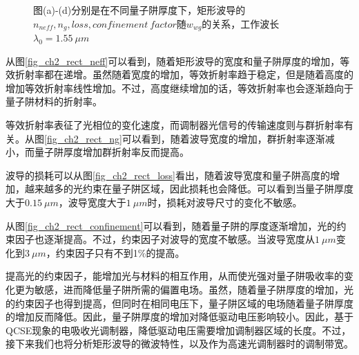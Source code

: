 \begin{figure}[htb]
{\begin{minipage}[]{0.5\textwidth}
	\end{minipage}}
\caption{图(a)-(d)分别是在不同量子阱厚度下，矩形波导的$n_{neff}, n_g, loss, confinement~factor$随$w_{wg}$的关系，工作波长$\lambda_0 = 1.55~\mu m$}
\label{fig_ch2_rect_property}
\end{figure}

从图\ref{fig_ch2_rect_neff}可以看到，随着矩形波导的宽度和量子阱厚度的增加，等效折射率都在递增。虽然随着宽度的增加，等效折射率趋于稳定，但是随着高度的增加等效折射率线性增加。不过，高度继续增加的话，等效折射率也会逐渐趋向于量子阱材料的折射率。

等效折射率表征了光相位的变化速度，而调制器光信号的传输速度则与群折射率有关。从图\ref{fig_ch2_rect_ng}可以看到，随着波导宽度的增加，群折射率逐渐减小，而量子阱厚度增加群折射率反而提高。

波导的损耗可以从图\ref{fig_ch2_rect_loss}看出，随着波导宽度和量子阱高度的增加，越来越多的光约束在量子阱区域，因此损耗也会降低。可以看到当量子阱厚度大于$0.15~ \mu m$，波导宽度大于$1~ \mu m$时，损耗对波导尺寸的变化不敏感。

从图\ref{fig_ch2_rect_confinement}可以看到，随着量子阱的厚度逐渐增加，光的约束因子也逐渐提高。不过，约束因子对波导的宽度不敏感。当波导宽度从$1 ~\mu m$变化到$3 ~\mu m$，约束因子只有不到1\%的提高。

提高光的约束因子，能增加光与材料的相互作用，从而使光强对量子阱吸收率的变化更为敏感，进而降低量子阱所需的偏置电场。虽然，随着量子阱厚度的增加，光的约束因子也得到提高，但同时在相同电压下，量子阱区域的电场随着量子阱厚度的增加反而降低。因此，量子阱厚度的增加对降低驱动电压影响较小。因此，基于QCSE现象的电吸收光调制器，降低驱动电压需要增加调制器区域的长度。不过，接下来我们也将分析矩形波导的微波特性，以及作为高速光调制器时的调制带宽。

